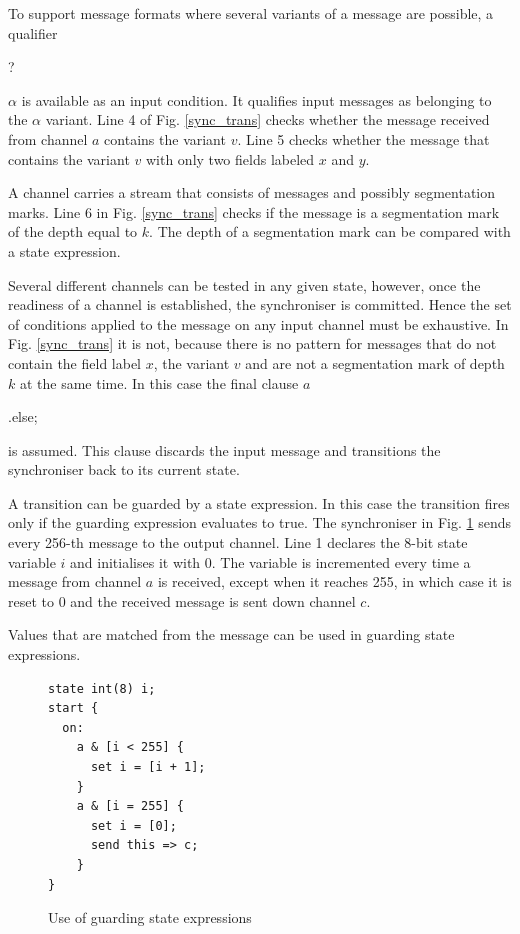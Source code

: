 To support message formats where several variants of a message are possible, a qualifier \begin{bf}?\end{bf}$\alpha$ is available as an input condition. It qualifies input messages as belonging to the $\alpha$ variant. Line 4 of Fig. \ref{sync_trans} checks whether the message received from channel $a$ contains the variant $v$. Line 5 checks whether the message that contains the variant $v$ with only two fields labeled $x$ and $y$. 

A channel carries a stream that consists of messages and possibly segmentation marks. Line 6 in Fig. \ref{sync_trans} checks if the message is a segmentation mark of the depth equal to $k$. The depth of a segmentation mark can be compared with a state expression.

Several different channels can be tested in any given state, however, once the readiness of a channel is established, the synchroniser is committed. Hence the set of conditions applied to the message on any input channel must be exhaustive. In Fig. \ref{sync_trans} it is not, because there is no pattern for messages that do not contain the field label $x$, the variant $v$ and are not a segmentation mark of depth $k$ at the same time. In this case the final clause $a$\begin{bf}.else;\end{bf} is assumed. This clause discards the input message and transitions the synchroniser back to its current state.

A transition can be guarded by a state expression. In this case the transition fires only if the guarding expression evaluates to true. The synchroniser in Fig. \ref{sync_g_state_exp} sends every 256-th message to the output channel. Line 1 declares the 8-bit state variable $i$ and initialises it with 0. The variable is incremented every time a message from channel $a$ is received, except when it reaches 255, in which case it is reset to 0 and the received message is sent down channel $c$. 

Values that are matched from the message can be used in guarding state expressions.
\begin{figure}[h!]
\lstset{numbers=left, numberstyle=\small, stepnumber=1, numbersep=8pt}
\begin{lstlisting}[frame=single]
state int(8) i;
start {
  on:
    a & [i < 255] {
      set i = [i + 1];
    }
    a & [i = 255] {
      set i = [0];
      send this => c;
    }
}
\end{lstlisting}
\caption{Use of guarding state expressions}
\label{sync_g_state_exp}
\end{figure}


